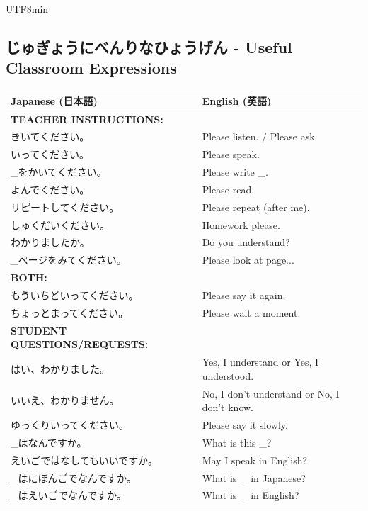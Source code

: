 \documentclass[11pt]{article}
\begin{document}
\begin{CJK}{UTF8}{min}
\subsection{じゅぎょうにべんりなひょうげん - Useful Classroom Expressions}
\begin{tabularx}{\textwidth}{X | X}
    \toprule
    \textbf{Japanese (日本語)} & \textbf{English (英語)} \\
    \midrule
    \textbf{TEACHER INSTRUCTIONS:} & \\
    きいてください。 & Please listen. / Please ask. \\
    いってください。 & Please speak. \\
    \_をかいてください。 & Please write \_. \\
    よんでください。 & Please read. \\
    リピートしてください。 & Please repeat (after me). \\
    しゅくだいください。 & Homework please. \\
    わかりましたか。 & Do you understand? \\
    \_ページをみてください。 & Please look at page... \\
    \hline
    \textbf{BOTH:} & \\
    もういちどいってください。& Please say it again. \\
    ちょっとまってください。& Please wait a moment. \\
    \hline
    \textbf{STUDENT QUESTIONS/REQUESTS:} & \\
    はい、わかりました。& Yes, I understand or Yes, I understood. \\
    いいえ、わかりません。& No, I don't understand or No, I don't know. \\
    ゆっくりいってください。& Please say it slowly. \\
    \_はなんですか。& What is this \_? \\
    えいごではなしてもいいですか。& May I speak in English? \\
    \_はにほんごでなんですか。& What is \_ in Japanese? \\
    \_はえいごでなんですか。& What is \_ in English? \\
    \bottomrule
\end{tabularx}


\end{CJK}
\end{document}

